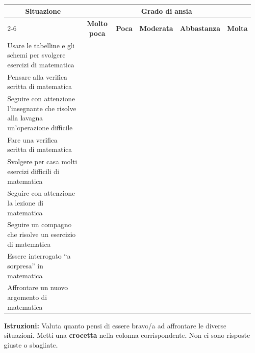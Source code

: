 \noindent
\begin{tabularx}{\textwidth}{|X|c|c|c|c|c|}
\hline
\multicolumn{1}{|c|}{\textbf{Situazione}} & \multicolumn{5}{c|}{\textbf{Grado di ansia}} \\
\cline{2-6}
\multicolumn{1}{|c|}{} & \textbf{\scriptsize Molto poca} & \textbf{\scriptsize Poca} & \textbf{\scriptsize Moderata} & \textbf{\scriptsize Abbastanza} & \textbf{\scriptsize Molta} \\
\hline
Usare le tabelline e gli schemi per svolgere esercizi di matematica &   &   &   &   &   \\
\hline
Pensare alla verifica scritta di matematica &   &   &   &   &   \\
\hline
Seguire con attenzione l'insegnante che risolve alla lavagna un'operazione difficile &   &   &   &   &   \\
\hline
Fare una verifica scritta di matematica &   &   &   &   &   \\
\hline
Svolgere per casa molti esercizi difficili di matematica &   &   &   &   &   \\
\hline
Seguire con attenzione la lezione di matematica &   &   &   &   &   \\
\hline
Seguire un compagno che risolve un esercizio di matematica &   &   &   &   &   \\
\hline
Essere interrogato “a sorpresa” in matematica &   &   &   &   &   \\
\hline
Affrontare un nuovo argomento di matematica &   &   &   &   &   \\
\hline
\end{tabularx}

\vspace{0.1cm}

\noindent\textbf{Istruzioni:} Valuta quanto pensi di essere bravo/a ad affrontare le diverse situazioni. Metti una \textbf{crocetta} nella colonna corrispondente. Non ci sono risposte giuste o sbagliate.
\newline

